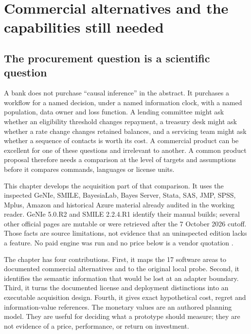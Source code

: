 
\chapter{Commercial alternatives and the capabilities still needed}
\label{exec17:s8}

\section{The procurement question is a scientific question}
\label{exec17:s8-question}

A bank does not purchase ``causal inference'' in the abstract. It purchases a
workflow for a named decision, under a named information clock, with a named
population, data owner and loss function. A lending committee might ask whether
an eligibility threshold changes repayment, a treasury desk might ask whether a
rate change changes retained balances, and a servicing team might ask whether a
sequence of contacts is worth its cost. A commercial product can be excellent
for one of these questions and irrelevant to another. A common product proposal
therefore needs a comparison at the level of targets and assumptions before it
compares commands, languages or license units.

This chapter develops the acquisition part of that comparison. It uses the inspected GeNIe,
SMILE, BayesiaLab, Bayes Server, Stata, SAS, JMP, SPSS, Mplus, Amazon and
historical Azure material already audited in the working reader. GeNIe 5.0.R2
and SMILE 2.2.4.R1 identify their manual builds; several other official pages
are mutable or were retrieved after the 7 October 2026 cutoff. Those facts are
source limitations, not evidence that an uninspected edition lacks a feature.
No paid engine was run and no price below is a vendor quotation
\citep{exec13_genie_readme,exec13_smile_intro,exec13_bayesia_api,
exec13_ci_bayesserver_causality,exec13_ci_stata_causal_intro}.

The chapter has four contributions. First, it maps the 17 software areas to
documented commercial alternatives and to the original local probe. Second,
it identifies the semantic information that would be lost at an adapter
boundary. Third, it turns the documented license and deployment distinctions
into an executable acquisition design. Fourth, it gives exact hypothetical
cost, regret and information-value references. The monetary values are an
authored planning model. They are useful for deciding what a prototype should
measure; they are not evidence of a price, performance, or return on investment.

